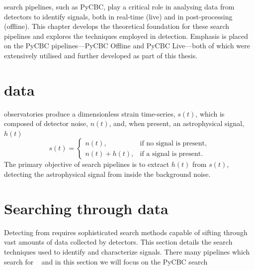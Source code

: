 



\Gwadj search pipelines, such as PyCBC, play a critical role in analysing data from detectors to identify \gwadj signals, both in real-time (live) and in post-processing (offline). This chapter develops the theoretical foundation for these search pipelines and explores the techniques employed in \gwadj detection. Emphasis is placed on the PyCBC pipelines---PyCBC Offline and PyCBC Live---both of which were extensively utilised and further developed as part of this thesis.

\section{\label{2:sec:gw-data}\Gwadj data}

\Gwadj observatories produce a dimensionless strain time-series, $s(t)$, which is composed of detector noise, $n(t)$, and, when present, an astrophysical \gwadj signal, $h(t)$
%
\begin{equation}
    s(t) =
    \begin{cases}
        n(t), & \text{if no signal is present}, \\
        n(t) + h(t), & \text{if a signal is present}.
    \end{cases}
\end{equation}
%
The primary objective of \gwadj search pipelines is to extract $h(t)$ from $s(t)$, detecting the astrophysical signal from inside the background noise.

\section{\label{2:sec:search-methods}Searching through \gwadj data}

Detecting \gws from \cbcs requires sophisticated search methods capable of sifting through vast amounts of data collected by \gwadj detectors. This section details the search techniques used to identify and characterize \gwadj signals. There many pipelines which search for \gws~\cite{pipelines} and in this section we will focus on the PyCBC search~\cite{PyCBC:2016, PyCBC:2017, PyCBC_package:2021}

